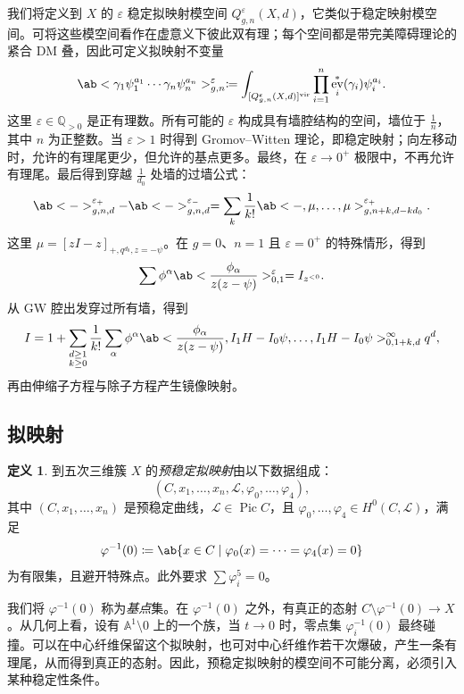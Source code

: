 \documentclass{amsart}
\theoremstyle{definition}
\newtheorem{defn}[thm]{定义}
\theoremstyle{remark}
\theoremstyle{plain}
\theoremstyle{definition}
\theoremstyle{remark}
\newcommand{\A}{\mathbb{A}}
\newcommand{\Q}{\mathbb{Q}}
\newcommand{\ep}{\varepsilon}
\newcommand{\mc}[1]{\mathcal{#1}}
\newcommand{\mr}[1]{\mathrm{#1}}
\newcommand{\1}{\mathbf{1}}
\newcommand{\2}{\mathbf{2}}
\newcommand{\3}{\mathbf{3}}
\newcommand{\vir}{\mr{vir}}
\DeclareMathOperator{\Pic}{Pic}
\DeclareMathOperator{\ev}{ev}
\begin{document}
我们将定义到 \(X\) 的 \(\ep\) 稳定拟映射模空间 \(Q_{g,n}^{\ep}(X, d)\)，它类似于稳定映射模空间。可将这些模空间看作在虚意义下彼此双有理；每个空间都是带完美障碍理论的紧合 DM 叠，因此可定义拟映射不变量
\[ \ab< \gamma_1 \psi_1^{a_1} \cdots \gamma_n \psi_n^{a_n}>_{g,n}^{\ep} \coloneqq \int_{[Q_{g,n}^{\ep}(X,d)]^{\vir}} \prod_{i=1}^n \ev_i^*(\gamma_i) \psi_i^{a_i}. \]
这里 \(\ep \in \Q_{>0}\) 是正有理数。所有可能的 \(\ep\) 构成具有墙腔结构的空间，墙位于 \(\frac{1}{n}\)，其中 \(n\) 为正整数。当 \(\ep > 1\) 时得到 Gromov--Witten 理论，即稳定映射；向左移动时，允许的有理尾更少，但允许的基点更多。最终，在 \(\ep \to 0^+\) 极限中，不再允许有理尾。最后得到穿越 \(\frac{1}{d_0}\) 处墙的过墙公式：
\[ \ab<->_{g,n,d}^{\ep_+} - \ab<->_{g,n,d}^{\ep_-} = \sum_{k} \frac{1}{k!} \ab<-, \mu, \ldots, \mu>_{g,n+k, d-kd_0}^{\ep_+}. \]
这里 \(\mu = [zI-z]_{+, q^{d_0}, z=-\psi}\)。在 \(g = 0\)、\(n = 1\) 且 \(\ep = 0^+\) 的特殊情形，得到
\[ \sum \phi^{\alpha} \ab<\frac{\phi_{\alpha}}{z(z-\psi)}>^{\ep}_{0,1} = I_{z^{<0}}. \]
从 GW 腔出发穿过所有墙，得到
\[ I = 1 + \sum_{\substack{d \geq 1 \\ k \geq 0}} \frac{1}{k!} \sum_{\alpha} \phi^{\alpha} \ab< \frac{\phi_{\alpha}}{z(z-\psi)}, I_1 H - I_0 \psi, \ldots, I_1 H - I_0 \psi>_{0,1+k,d}^{\infty} q^d, \]
再由伸缩子方程与除子方程产生镜像映射。

\subsection{拟映射}%
\label{sub:Quasimaps}

\begin{defn}
    到五次三维簇 \(X\) 的\textit{预稳定拟映射}由以下数据组成：
    \[(C, x_1, \ldots, x_n, \mc{L}, \varphi_0, \ldots, \varphi_4),\] 
    其中 \((C, x_1, \ldots, x_n)\) 是预稳定曲线，\(\mc{L} \in \Pic C\)，且 \(\varphi_0, \ldots, \varphi_4 \in H^0(C, \mc{L})\)，满足
    \[ \varphi^{-1}(0) \coloneqq \ab\{x \in C \mid \varphi_0(x) = \cdots = \varphi_4(x) = 0 \} \]
    为有限集，且避开特殊点。此外要求 \(\sum \varphi_i^5 = 0\)。
\end{defn}

我们将 \(\varphi^{-1}(0)\) 称为\textit{基点}集。在 \(\varphi^{-1}(0)\) 之外，有真正的态射 \(C \setminus \varphi^{-1}(0) \to X\)。从几何上看，设有 \(\A^1 \setminus 0\) 上的一个族，当 \(t \to 0\) 时，零点集 \(\varphi_i^{-1}(0)\) 最终碰撞。可以在中心纤维保留这个拟映射，也可对中心纤维作若干次爆破，产生一条有理尾，从而得到真正的态射。因此，预稳定拟映射的模空间不可能分离，必须引入某种稳定性条件。
\end{document}
